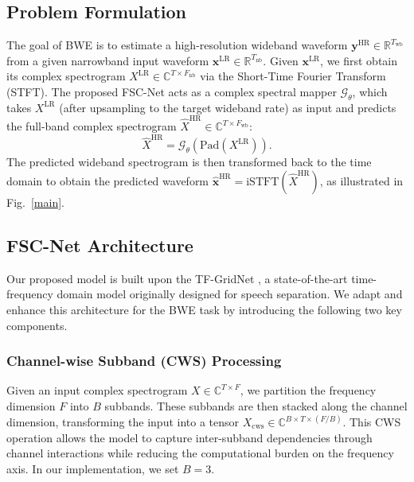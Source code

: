 \documentclass[journal]{IEEEtran}
\begin{document}
\subsection{Problem Formulation}
The goal of BWE is to estimate a high-resolution wideband waveform $\mathbf{y}^{\mathrm{HR}} \in \mathbb{R}^{T_{\mathrm{wb}}}$ from a given narrowband input waveform $\mathbf{x}^{\mathrm{LR}} \in \mathbb{R}^{T_{\mathrm{nb}}}$.  Given $\mathbf{x}^{\mathrm{LR}}$, we first obtain its complex spectrogram $X^{\mathrm{LR}} \in \mathbb{C}^{T \times F_{\mathrm{nb}}}$ via the Short-Time Fourier Transform (STFT).
The proposed FSC-Net acts as a complex spectral mapper $\mathcal{G}_\theta$, which takes $X^{\mathrm{LR}}$ (after upsampling to the target wideband rate) as input and predicts the full-band complex spectrogram $\hat{X}^{\mathrm{HR}} \in \mathbb{C}^{T \times F_{\mathrm{wb}}}$:
\begin{equation}
    \hat{X}^{\mathrm{HR}} = \mathcal{G}_\theta(\text{Pad}(X^{\mathrm{LR}})).
\end{equation}
The predicted wideband spectrogram is then transformed back to the time domain to obtain the predicted waveform $\hat{\mathbf{x}}^{\mathrm{HR}} = \text{iSTFT}(\hat{X}^{\mathrm{HR}})$, as illustrated in Fig.~\ref{main}.

\subsection{FSC-Net Architecture}
Our proposed model is built upon the TF-GridNet \cite{tfgridnet}, a state-of-the-art time-frequency domain model originally designed for speech separation. We adapt and enhance this architecture for the BWE task by introducing the following two key components.

\subsubsection{Channel-wise Subband (CWS) Processing}
 Given an input complex spectrogram $X \in \mathbb{C}^{T \times F}$, we partition the frequency dimension $F$ into $B$ subbands. These subbands are then stacked along the channel dimension, transforming the input into a tensor $X_{\mathrm{cws}} \in \mathbb{C}^{B \times T \times (F/B)}$. This CWS operation \cite{rong2025ts} allows the model to capture inter-subband dependencies through channel interactions while reducing the computational burden on the frequency axis. In our implementation, we set $B=3$.
\end{document}
